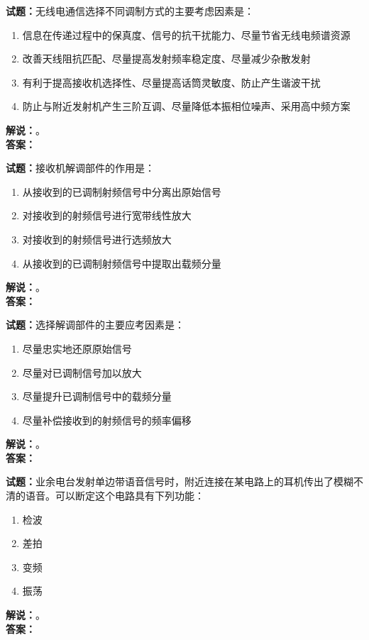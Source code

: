 \documentclass{ctexbook}
\begin{document}
\bigskip

\noindent\textbf{试题：}无线电通信选择不同调制方式的主要考虑因素是：
\begin{enumerate}[leftmargin=3em]
  \item 信息在传递过程中的保真度、信号的抗干扰能力、尽量节省无线电频谱资源
  \item 改善天线阻抗匹配、尽量提高发射频率稳定度、尽量减少杂散发射
  \item 有利于提高接收机选择性、尽量提高话筒灵敏度、防止产生谐波干扰
  \item 防止与附近发射机产生三阶互调、尽量降低本振相位噪声、采用高中频方案
\end{enumerate}
\noindent\textbf{解说：}\textbf{}。\\\noindent\textbf{答案：}

\bigskip

\noindent\textbf{试题：}接收机解调部件的作用是：
\begin{enumerate}[leftmargin=3em]
  \item 从接收到的已调制射频信号中分离出原始信号
  \item 对接收到的射频信号进行宽带线性放大
  \item 对接收到的射频信号进行选频放大
  \item 从接收到的已调制射频信号中提取出载频分量
\end{enumerate}
\noindent\textbf{解说：}\textbf{}。\\\noindent\textbf{答案：}

\bigskip

\noindent\textbf{试题：}选择解调部件的主要应考因素是：
\begin{enumerate}[leftmargin=3em]
  \item 尽量忠实地还原原始信号
  \item 尽量对已调制信号加以放大
  \item 尽量提升已调制信号中的载频分量
  \item 尽量补偿接收到的射频信号的频率偏移
\end{enumerate}
\noindent\textbf{解说：}\textbf{}。\\\noindent\textbf{答案：}

\bigskip

\noindent\textbf{试题：}业余电台发射单边带语音信号时，附近连接在某电路上的耳机传出了模糊不清的语音。可以断定这个电路具有下列功能：
\begin{enumerate}[leftmargin=3em]
  \item 检波
  \item 差拍
  \item 变频
  \item 振荡
\end{enumerate}
\noindent\textbf{解说：}\textbf{}。\\\noindent\textbf{答案：}
\end{document}
